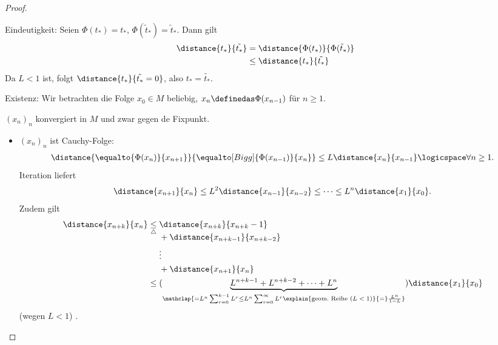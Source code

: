 \begin{proof}
    \begin{proofdescription}
        \item[Eindeutigkeit:] Seien \( \Phi(t_*)=t_*\), \( \Phi(\tilde{t}_*)=\tilde{t}_* \). Dann gilt
        \begin{align*}
            \distance{t_*}{\tilde{t_*} }\begin{aligned}[t]
                &=\distance{\Phi(t_*)}{\Phi(\tilde{t}_*)}\\
                &\leq \distance{t_*}{\tilde{t_*} }
            \end{aligned}
        \end{align*} 
        Da \( L<1\) ist, folgt \( \distance{t_*}{\tilde{t_*}=0 }\), also \( t_*=\tilde{t_*} \).
        \item[Existenz:] Wir betrachten die Folge \( x_0\in M\) beliebig, \( x_n\definedas \Phi(x_{n-1})\) für \( n\geq 1\).
        \begin{behauptung*}
            \( (x_n)_n\) konvergiert in \( M\)  und zwar gegen de Fixpunkt.
        \end{behauptung*}
        \begin{subproof}
            \begin{itemize}
                \item \( (x_n)_n\) ist Cauchy-Folge:
                \begin{align*}
                    \distance{\equalto{\Phi(x_n)}{x_{n+1}}}{\equalto[Bigg]{\Phi(x_{n-1})}{x_n}}\leq L \distance{x_n}{x_{n-1}}\logicspace \forall n\geq 1.
                \end{align*}
                Iteration liefert
                \begin{align*}
                    \distance{x_{n+1}}{x_n}\leq L^2 \distance{x_{n-1}}{x_{n-2}}\leq \cdots \leq L^n \distance{x_1}{x_0}.
                \end{align*}
                Zudem gilt
                \begin{align*}
                    \distance{x_{n+k}}{x_n}\begin{aligned}[t]
                        &\underset{\triangle}{\leq}\begin{aligned}[t]
                            &\distance{x_{n+k}}{x_{n+k}-1}\\
                            &+\distance{x_{n+k-1}}{x_{n+k-2}}\\
                            &\vdots\\
                            &+\distance{x_{n+1}}{x_n}
                        \end{aligned}\\
                        &\leq (\underbrace{L^{n+k-1}+L^{n+k-2}+\cdots+L^n}_{\mathclap{=L^n \sum_{r=0}^{k-1} L^r\leq L^n \sum_{r=0}^{\infty} L^r\explain{\text{geom.\ Reihe (\( L<1\))}}{=}\frac{L^n}{1-L}}})\distance{x_1}{x_0}
                    \end{aligned}
                \end{align*}
                \timplies (wegen \( L<1\)) \Beh.
                

\end{itemize}
\end{subproof}
\end{proofdescription}
\end{proof}
